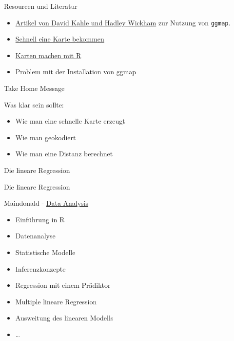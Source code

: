 \documentclass[ignorenonframetext,]{beamer}
\providecommand{\tightlist}{%
\setlength{\itemsep}{0pt}\setlength{\parskip}{0pt}}
\begin{document}
\begin{frame}[fragile]{Resourcen und Literatur}

\begin{itemize}
\item
  \href{http://journal.r-project.org/archive/2013-1/kahle-wickham.pdf}{Artikel
  von David Kahle und Hadley Wickham} zur Nutzung von \texttt{ggmap}.
\item
  \href{http://rpackages.ianhowson.com/cran/ggmap/man/get_map.html}{Schnell
  eine Karte bekommen}
\item
  \href{http://www.kevjohnson.org/making-maps-in-r-part-2/}{Karten
  machen mit R}
\item
  \href{http://stackoverflow.com/questions/40642850/ggmap-error-geomrasterann-was-built-with-an-incompatible-version-of-ggproto}{Problem
  mit der Installation von ggmap}
\end{itemize}

\end{frame}

\begin{frame}{Take Home Message}

Was klar sein sollte:

\begin{itemize}
\tightlist
\item
  Wie man eine schnelle Karte erzeugt
\item
  Wie man geokodiert
\item
  Wie man eine Distanz berechnet
\end{itemize}

\end{frame}

\begin{frame}{Die lineare Regression}

\end{frame}

\begin{frame}{Die lineare Regression}

Maindonald -
\href{https://cran.r-project.org/doc/contrib/usingR.pdf}{Data Analysis}

\begin{itemize}
\tightlist
\item
  Einführung in R
\item
  Datenanalyse
\item
  Statistische Modelle
\item
  Inferenzkonzepte
\item
  Regression mit einem Prädiktor
\item
  Multiple lineare Regression
\item
  Ausweitung des linearen Modells
\item
  \ldots{}
\end{itemize}

\end{frame}
\end{document}
